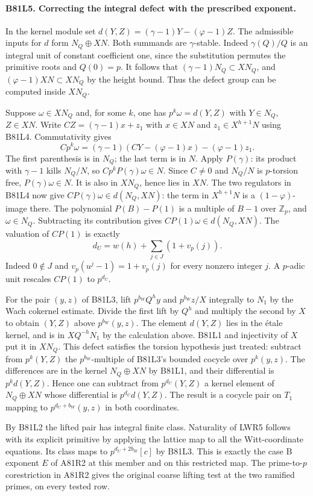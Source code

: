 \paragraph{B81L5. Correcting the integral defect with the prescribed exponent.}
In the kernel module set $d(Y,Z)=(\gamma-1)Y-(\varphi-1)Z$.
The admissible inputs for $d$ form $N_Q\oplus XN$.
Both summands are $\gamma$-stable. Indeed $\gamma(Q)/Q$ is an
integral unit of constant coefficient one, since the substitution
permutes the primitive roots and $Q(0)=p$. It follows that
$(\gamma-1)N_Q\subset XN_Q$, and
$(\varphi-1)XN\subset XN_Q$ by the height bound. Thus
the defect group can be computed inside $XN_Q$.

Suppose $\omega\in XN_Q$ and, for some $k$, one has
$p^k\omega=d(Y,Z)$ with $Y\in N_Q$, $Z\in XN$. Write
$CZ=(\gamma-1)x+z_1$ with $x\in XN$ and
$z_1\in X^{h+1}N$ using B81L4. Commutativity gives
\[
 Cp^k\omega=(\gamma-1)(CY-(\varphi-1)x)-(\varphi-1)z_1.
\]
The first parenthesis is in $N_Q$; the last term is in $N$.
Apply $P(\gamma)$: its product with $\gamma-1$ kills $N_Q/N$,
so $Cp^kP(\gamma)\omega\in N$. Since $C\ne0$ and $N_Q/N$ is
$p$-torsion free, $P(\gamma)\omega\in N$. It is also in
$XN_Q$, hence lies in $XN$. The two regulators in B81L4 now give
$CP(\gamma)\omega\in d(N_Q,XN)$: the term in $X^{h+1}N$
is a $(1-\varphi)$-image there. The polynomial
$P(B)-P(1)$ is a multiple of $B-1$ over $\mathbb Z_p$, and
$\omega\in N_Q$. Subtracting its contribution gives
$CP(1)\omega\in d(N_Q,XN)$. The valuation of $CP(1)$ is exactly
\[
                 d_U=w(h)+\sum_{j\in J}(1+v_p(j)).
\]
Indeed $0\notin J$ and $v_p(u^j-1)=1+v_p(j)$ for every nonzero
integer $j$. A $p$-adic unit rescales $CP(1)$ to $p^{d_U}$.

For the pair $(y,z)$ of B81L3, lift $p^{b_W}Q^h y$ and
$p^{b_W} z/X$ integrally to $N_1$ by the Wach cokernel estimate.
Divide the first lift by $Q^h$ and multiply the second by $X$ to
obtain $(Y,Z)$ above $p^{b_W}(y,z)$. The element $d(Y,Z)$ lies
in the \'etale kernel, and is in $XQ^{-h}N_1$ by the calculation
above. B81L1 and injectivity of $X$ put it in $XN_Q$. This
defect satisfies the torsion hypothesis just treated: subtract
from $p^k(Y,Z)$ the $p^{b_W}$-multiple of B81L3's bounded
cocycle over $p^k(y,z)$. The differences are in the kernel
$N_Q\oplus XN$ by B81L1, and their differential is $p^kd(Y,Z)$.
Hence one can subtract from $p^{d_U}(Y,Z)$ a kernel element
of $N_Q\oplus XN$ whose differential is $p^{d_U}d(Y,Z)$. The result is a cocycle
pair on $T_1$ mapping to $p^{d_U+b_W}(y,z)$ in both coordinates.

By B81L2 the lifted pair has integral finite class. Naturality of
LWR5 follows with its explicit primitive by applying the lattice
map to all the Witt-coordinate equations. Its class maps to
$p^{d_U+2b_W}[c]$ by B81L3. This is exactly the case B exponent
$E$ of A81R2 at this member and on this restricted map. The
prime-to-$p$ corestriction in A81R2 gives the original coarse
lifting test at the two ramified primes, on every tested row.
